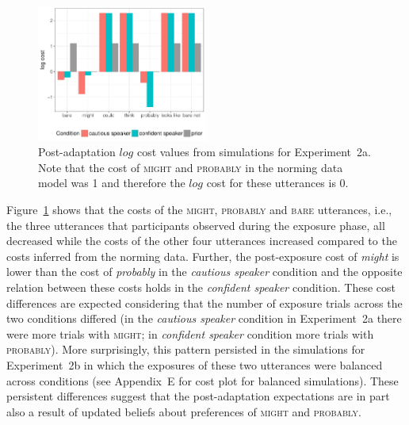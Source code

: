 \documentclass[man, floatsintext]{apa6}
\begin{document}
\begin{figure}
\center
  \includegraphics[width=0.5\textwidth]{plots/adaptation-posterior-costs.pdf}
  \caption{Post-adaptation $log$ cost values from simulations for Experiment~2a. Note that the cost of \textsc{might} and \textsc{probably} 
  in the norming data model was 1 and therefore the $log$ cost for these utterances is 0. \label{fig:post-exposure-costs}}
\end{figure}

Figure~\ref{fig:post-exposure-costs} shows that the costs of the \textsc{might}, \textsc{probably} and
\textsc{bare} utterances, i.e., the three utterances that participants observed during the exposure phase,
all decreased while the costs of the other four utterances increased compared to the costs inferred from the norming
data. Further, the post-exposure cost of \textit{might} is lower than the cost of \textit{probably} in the \textit{cautious speaker} condition
and the opposite relation between these costs holds in the \textit{confident speaker} condition. These cost differences
are expected considering that the number of exposure trials across the two conditions differed (in the \textit{cautious speaker} condition in Experiment~2a there were more trials
with \textsc{might}; in \textit{confident speaker} condition more trials with \textsc{probably}). More surprisingly, this pattern
persisted in the simulations for Experiment~2b in which the exposures of these two utterances were balanced across conditions 
(see Appendix~E for cost plot for balanced simulations).
These persistent differences suggest that the post-adaptation expectations 
are in part also a result of updated beliefs about preferences of \textsc{might} and \textsc{probably}. 

%
\end{document}
